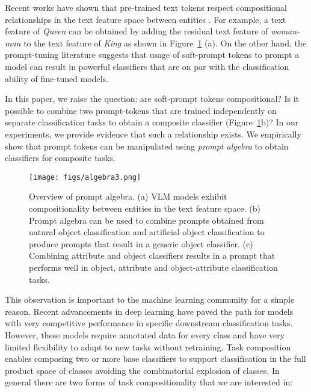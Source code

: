 \documentclass[10pt,twocolumn,letterpaper]{article}
\begin{document}
Recent works have shown that pre-trained text tokens respect compositional relationships in the text feature space between entities \cite{word2vec,tewel2021zero,distil}. For example, a text feature of \textit{Queen} can be obtained by adding the residual text feature of \textit{woman-man} to the text feature of \textit{King} as shown in Figure~\ref{fig:algebra} (a). On the other hand, the prompt-tuning literature \cite{lester-etal-2021-power, xianglisaliprefixtuning, liupretrainprompt, liu-etal-2022-p} suggests that usage of soft-prompt tokens to prompt a model can result in powerful classifiers that are on par with the classification ability of fine-tuned models. 

In this paper, we raise the question: are soft-prompt tokens compositional? Is it possible to combine two prompt-tokens that are trained independently on separate classification tasks to obtain a composite classifier (Figure~\ref{fig:algebra}b)? In our experiments, we provide evidence that such a relationship exists. We empirically show that prompt tokens can be manipulated using \textit{prompt algebra} to obtain classifiers for composite tasks.

\begin{figure}[t] 
\centering
\texttt{[image: figs/algebra3.png]} 
\caption{ Overview of prompt algebra. (a) VLM models exhibit compositionality between entities in the text feature space. (b) Prompt algebra can be used to combine prompts obtained from natural object classification and artificial object classification to produce prompts that result in a generic object classifier. (c) Combining attribute and object classifiers results in a prompt that performs well in object, attribute and object-attribute classification tasks.}
\label{fig:algebra}
\end{figure}

This observation is important to the machine learning community for a simple reason. Recent advancements in deep learning\cite{he15deepresidual,WRN,vit} have paved the path for models with very competitive performance in specific downstream classification tasks. However, these models require annotated data for every class and have very limited flexibility to adapt to new tasks without retraining. Task composition enables composing two or more base classifiers to support classification in the full product space of classes avoiding the 
combinatorial explosion of classes. In general there are two forms of task compositionality that we are interested in:\\
\end{document}
